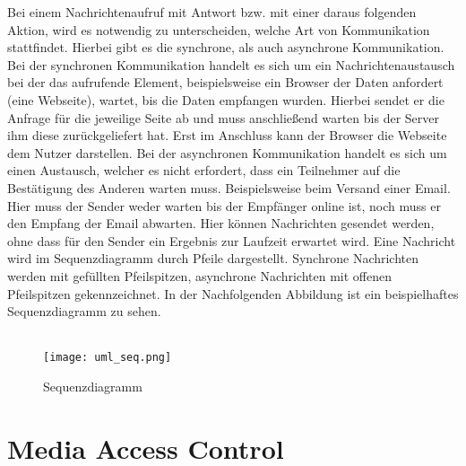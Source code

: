 Bei einem Nachrichtenaufruf mit Antwort bzw. mit einer daraus folgenden Aktion, wird es notwendig zu unterscheiden, welche Art von Kommunikation stattfindet. Hierbei gibt es die synchrone, als auch asynchrone Kommunikation.
Bei der synchronen Kommunikation handelt es sich um ein Nachrichtenaustausch bei der das aufrufende Element, beispielsweise ein Browser der Daten anfordert (eine Webseite), wartet, bis die Daten empfangen wurden. Hierbei sendet er die Anfrage für die jeweilige Seite ab und muss anschließend warten bis der Server ihm diese zurückgeliefert hat. Erst im Anschluss kann der Browser die Webseite dem Nutzer darstellen.
Bei der asynchronen Kommunikation handelt es sich um einen Austausch, welcher es nicht erfordert, dass ein Teilnehmer auf die Bestätigung des Anderen warten muss. Beispielsweise beim Versand einer Email. Hier muss der Sender weder warten bis der Empfänger online ist, noch muss er den Empfang der Email abwarten. Hier können Nachrichten gesendet werden, ohne dass für den Sender ein Ergebnis zur Laufzeit erwartet wird.
Eine Nachricht wird im Sequenzdiagramm durch Pfeile dargestellt. Synchrone Nachrichten werden mit gefüllten Pfeilspitzen, asynchrone Nachrichten mit offenen Pfeilspitzen gekennzeichnet. In der Nachfolgenden Abbildung ist ein beispielhaftes Sequenzdiagramm zu sehen.\\
\\
\begin{figure}[H]
\centering
\texttt{[image: uml\_seq.png]}
\caption{Sequenzdiagramm}
\label{fig:show_s1_s2_p1_n1}
\end{figure}

\section{Media Access Control}
\label{sec:mac}

